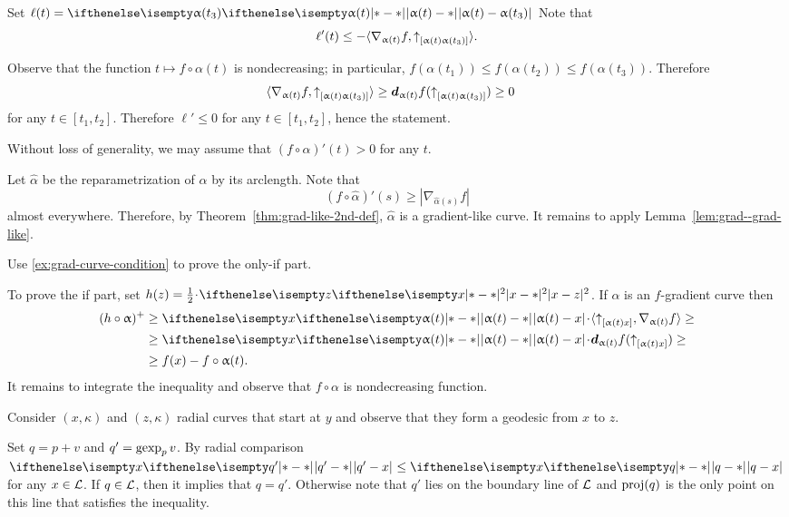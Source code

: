 Set $\ell(t)=\dist{\alpha(t)}{\alpha(t_3)}{}$
Note that 
\[\ell'(t)\le -\langle \nabla_{\alpha(t)}f,\dir{\alpha(t)}{\alpha(t_3)}\rangle.\]

Observe that the function $t\mapsto f\circ\alpha(t)$ is nondecreasing;
in particular, $f(\alpha(t_1))\le f(\alpha(t_2))\le f(\alpha(t_3))$.
Therefore 
\begin{align*}\langle \nabla_{\alpha(t)}f,\dir{\alpha(t)}{\alpha(t_3)}\rangle&\ge\dd_{\alpha(t)}f(\dir{\alpha(t)}{\alpha(t_3)})\ge 0
\end{align*}
for any $t\in[t_1,t_2]$.
Therefore $\ell'\le 0$ for any $t\in[t_1,t_2]$, hence the statement.

Without loss of generality, we may assume that $(f\circ\alpha)'(t)>0$ for any $t$.

Let $\hat\alpha$ be the reparametrization of $\alpha$ by its arclength.
Note that 
\[(f\circ\hat\alpha)'(s)\ge |\nabla_{\hat\alpha(s)}f|\]
almost everywhere.
Therefore, by Theorem~\ref{thm:grad-like-2nd-def}, $\hat\alpha$ is a gradient-like curve.
It remains to apply Lemma~\ref{lem:grad--grad-like}.

Use \ref{ex:grad-curve-condition} to prove the only-if part.

To prove the if part, set $h(z)=\tfrac12\cdot\dist[2]{x}{z}{}$.
If $\alpha$ is an $f$-gradient curve then 
\begin{align*}
(h\circ\alpha)^+&\ge \dist{\alpha(t)}{x}{}\cdot\langle\dir{\alpha(t)}{x},\nabla_{\alpha(t)}f\rangle\ge
\\
&\ge \dist{\alpha(t)}{x}{}\cdot\dd_{\alpha(t)}f(\dir{\alpha(t)}{x})\ge 
\\
&\ge f(x)-f\circ\alpha(t).
\end{align*}
It remains to integrate the inequality and observe that $f\circ\alpha$ is nondecreasing function.
 


Consider $(x,\kappa)$ and $(z,\kappa)$ radial curves that start at $y$
and observe that they form a geodesic from $x$ to $z$.

 Set $q=p+v$ and $q'=\mathop{\rm gexp}\nolimits_pv$. 
By radial comparison $\dist{q'}{x}{}\le \dist{q}{x}{}$ for any $x\in \spc{L}$.
If $q\in \spc{L}$, then it implies that $q=q'$.
Otherwise note that $q'$ lies on the boundary line of $\mathcal{L}$ and $\mathop{\rm proj}\nolimits(q)$ is the only point on this line that satisfies the inequality.


